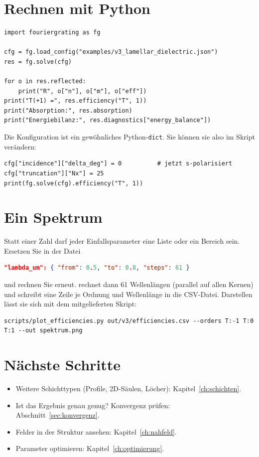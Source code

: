 \section{Rechnen mit Python}
\begin{lstlisting}[style=py]
import fouriergrating as fg

cfg = fg.load_config("examples/v3_lamellar_dielectric.json")
res = fg.solve(cfg)

for o in res.reflected:
    print("R", o["n"], o["m"], o["eff"])
print("T(+1) =", res.efficiency("T", 1))
print("Absorption:", res.absorption)
print("Energiebilanz:", res.diagnostics["energy_balance"])
\end{lstlisting}
Die Konfiguration ist ein gewöhnliches Python-\texttt{dict}. Sie können sie also im Skript verändern:
\begin{lstlisting}[style=py]
cfg["incidence"]["delta_deg"] = 0          # jetzt s-polarisiert
cfg["truncation"]["Nx"] = 25
print(fg.solve(cfg).efficiency("T", 1))
\end{lstlisting}

\section{Ein Spektrum}
Statt einer Zahl darf jeder Einfallsparameter eine Liste oder ein Bereich sein. Ersetzen Sie in der Datei
\begin{lstlisting}[language=json]
"lambda_um": { "from": 0.5, "to": 0.8, "steps": 61 }
\end{lstlisting}
und rechnen Sie erneut.  rechnet dann 61 Wellenlängen (parallel auf allen Kernen) und schreibt eine
Zeile je Ordnung und Wellenlänge in die CSV-Datei. Darstellen lässt sie sich mit dem mitgelieferten Skript:
\begin{lstlisting}[style=shell]
scripts/plot_efficiencies.py out/v3/efficiencies.csv --orders T:-1 T:0 T:1 --out spektrum.png
\end{lstlisting}

\section{Nächste Schritte}
\begin{itemize}
  \item Weitere Schichttypen (Profile, 2D-Säulen, Löcher): Kapitel~\ref{ch:schichten}.
  \item Ist das Ergebnis genau genug? Konvergenz prüfen: Abschnitt~\ref{sec:konvergenz}.
  \item Felder in der Struktur ansehen: Kapitel~\ref{ch:nahfeld}.
  \item Parameter optimieren: Kapitel~\ref{ch:optimierung}.
\end{itemize}
